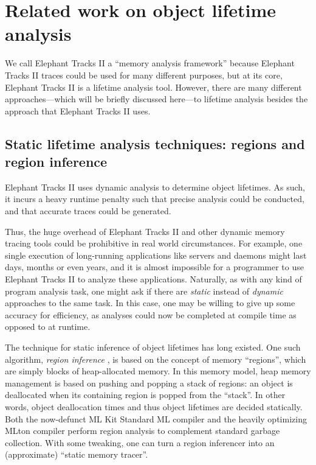 \section{Related work on object lifetime analysis}
We call Elephant Tracks II a ``memory analysis framework'' because Elephant Tracks II traces could be used
for many different purposes, but at its core, Elephant Tracks II is a lifetime analysis tool. However, there
are many different approaches---which will be briefly discussed here---to lifetime analysis besides the approach that
Elephant Tracks II uses.

\subsection{Static lifetime analysis techniques: regions and region inference}
Elephant Tracks II uses dynamic analysis to determine object lifetimes. As such,
it incurs a heavy runtime penalty such that precise analysis could be conducted, and
that accurate traces could be generated.

Thus, the huge overhead of Elephant Tracks II and other dynamic memory tracing
tools could be prohibitive in real world circumstances. For example, one single
execution of long-running applications like servers and daemons might last days, months
or even years, and it is almost impossible for a programmer to use Elephant Tracks II
to analyze these applications. Naturally, as with any kind of program analysis task, one
might ask if there are \emph{static} instead of \emph{dynamic} approaches to the same task.
In this case, one may be willing to give up some accuracy for efficiency, as analyses could
now be completed at compile time as opposed to at runtime.

The technique for static inference of object lifetimes has long existed. One such algorithm,
\emph{region inference} \citep{RegionInference, StackOfRegions}, is based on the concept of memory ``regions'', which are simply
blocks of heap-allocated memory. In this memory model, heap memory management is based on pushing
and popping a stack of regions: an object is deallocated when its containing region is popped from the
``stack''. In other words, object deallocation times and thus object lifetimes are decided statically. Both
the now-defunct ML Kit Standard ML compiler and the heavily optimizing MLton \citep{MLton} compiler
perform region analysis to complement standard garbage collection. With some tweaking, one can turn a
region inferencer into an (approximate) ``static memory tracer''.

